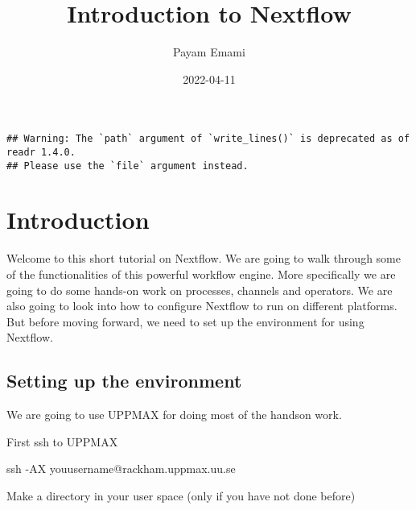 \documentclass[
]{book}
\title{Introduction to Nextflow}
\author{Payam Emami}
\date{2022-04-11}
\newenvironment{Shaded}{\begin{snugshade}}{\end{snugshade}}
\newcommand{\AttributeTok}[1]{\textcolor[rgb]{0.77,0.63,0.00}{#1}}
\newcommand{\FunctionTok}[1]{\textcolor[rgb]{0.00,0.00,0.00}{#1}}
\newcommand{\NormalTok}[1]{#1}
\newcommand{\VariableTok}[1]{\textcolor[rgb]{0.00,0.00,0.00}{#1}}
\begin{document}
\maketitle

{
\setcounter{tocdepth}{1}
\tableofcontents
}
\begin{verbatim}
## Warning: The `path` argument of `write_lines()` is deprecated as of readr 1.4.0.
## Please use the `file` argument instead.
\end{verbatim}

\hypertarget{introduction}{%
\chapter{Introduction}\label{introduction}}

Welcome to this short tutorial on Nextflow. We are going to walk through some of the functionalities of this powerful workflow engine. More specifically we are going to do some hands-on work on processes, channels and operators. We are also going to look into how to configure Nextflow to run on different platforms. But before moving forward, we need to set up the environment for using Nextflow.

\hypertarget{setting-up-the-environment}{%
\section{Setting up the environment}\label{setting-up-the-environment}}

We are going to use UPPMAX for doing most of the handson work.

First ssh to UPPMAX

\begin{Shaded}
\begin{Highlighting}[numbers=left,,]
\FunctionTok{ssh} \AttributeTok{{-}AX}\NormalTok{ youusername@rackham.uppmax.uu.se}
\end{Highlighting}
\end{Shaded}

Make a directory in your user space (only if you have not done before)

\begin{Shaded}
\end{Shaded}
\end{document}
